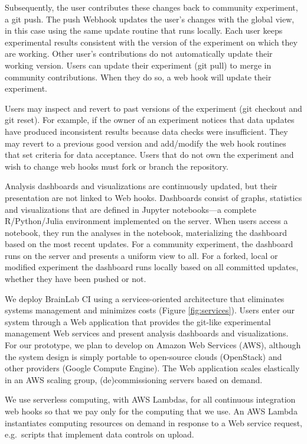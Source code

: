 Subsequently, the user contributes these changes back to community experiment,
a \textsf{git push}.  The push Webhook updates the user's changes with the global
view, in this case using the same update routine that runs locally.
Each user keeps experimental results consistent with the 
version of the experiment on which they are working.  Other user's contributions
do not automatically update their working version.  Users can update their
experiment (\textsf{git pull}) to merge in community contributions.  When 
they do so, a web hook will update their experiment.

Users may inspect and revert to past versions of the experiment
(\textsf{git checkout} and \textsf{git reset}).  For example, if the owner of
an experiment notices that data updates have produced inconsistent results
because data checks were insufficient.  They may revert to a previous good version
and add/modify the web hook routines that set criteria for data acceptance.
Users that do not own the experiment and wish to change web hooks must fork or 
branch the repository.

Analysis dashboards and visualizations are continuously updated, but their presentation are 
not linked to Web hooks.  Dashboards consist of graphs, statistics and visualizations
that are defined in Jupyter notebooks---a complete R/Python/Julia environment implemented
on the server.  When users access a notebook, they run the analyses in the notebook, materializing
the dashboard based on the most recent updates.  For a community experiment, the dashboard runs 
on the server and presents a uniform view to all.  For a forked, local or modified experiment the
dashboard runs locally based on all committed updates, whether they have been pushed or not.
 
%
We deploy BrainLab CI using a services-oriented architecture that eliminates systems
management and minimizes costs (Figure \ref{fig:services}).  Users enter our system 
through a Web application that provides the git-like experimental management Web services
and present analysis dashboards and visualizations.   For our prototype, we 
plan to develop on Amazon Web Services (AWS), although the system design is simply
portable to open-source clouds (OpenStack) and other providers (Google Compute Engine). 
The Web application scales elastically in an AWS scaling group, 
(de)commissioning servers based on demand.

We use serverless computing, with AWS Lambdas, for all continuous integration web hooks so that we
pay only for the computing that we use.  An AWS Lambda instantiates computing resources
on demand in response to a Web service request, e.g.~scripts that implement data controls 
on upload.

